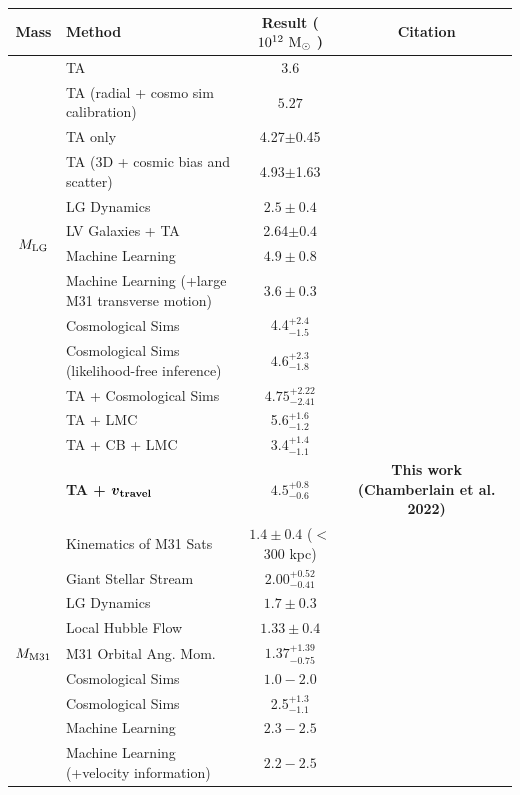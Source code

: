 \documentclass[twocolumn]{aastex631}
\newcommand{\mlg}{\ensuremath{M_{\rm LG}}}
\newcommand{\mmto}{\ensuremath{M_{\rm M31}}}
\newcommand{\bov}{\ensuremath{\boldsymbol{v}}}
\newcommand{\vtrav}{\ensuremath{\bov_{\rm travel}}}
\begin{document}
\begin{table}
  \centering
  \begin{tabular}{clc|c}
    \hline\hline
    Mass & Method & Result ($ 10^{12}~\mathrm{M}_\odot$ ) & Citation \\\hline
    \multirow{12}{*}{\mlg}  & TA & $3.6$ & \cite{Lynden-Bell:1981} \\
    &TA (radial + cosmo sim calibration)  & $5.27$& \cite{LiWhite2008} \\
    &{TA only} & {4.27$\pm$0.45} & \cite{vdm2012} \\
    &{TA (3D + cosmic bias and scatter)} & {4.93$\pm$1.63} &\cite{vdm2012}\\
    & LG Dynamics &$2.5\pm0.4$ & \cite{Diaz2014}\\
    &{LV Galaxies + TA} & {2.64$\pm0.4$} & \cite{Penarrubia2016} \\
    & Machine Learning & $4.9 \pm 0.8$ & \cite{McLeod2017}\\
    & Machine Learning (+large M31 transverse motion) & $3.6\pm0.3$ & 
    \cite{McLeod2017}\\
    & Cosmological Sims & 4.4$^{+2.4}_{-1.5}$ & \cite{Zhai2020}\\
    & Cosmological Sims (likelihood-free inference) & $4.6^{+2.3}_{-1.8}$ &
    \cite{Lemos2021}\\
    & TA + Cosmological Sims & $4.75^{+2.22}_{-2.41}$ & \cite{Hartl2021}\\
    & TA + LMC & 5.6$^{+1.6}_{-1.2}$ & \cite{Benisty2022}\\
    & TA + CB + LMC & 3.4$^{+1.4}_{-1.1}$ & \cite{Benisty2022}\\
    & \textbf{TA + $\boldsymbol{\vtrav}$} & {$\boldsymbol{4.5^{+0.8}_{-0.6}}$}&
    \textbf{This work (Chamberlain et al. 2022)}\\
    \hline
    \multirow{9}{*}{\mmto}& Kinematics of M31 Sats & $1.4 \pm 0.4$ ($<$300 kpc)
    & \cite{Watkins2010}\\
    & Giant Stellar Stream & $2.00^{+0.52}_{-0.41}$ & \cite{Fardal2013}\\
    & LG Dynamics &$1.7\pm0.3$ & \cite{Diaz2014}\\
    & Local Hubble Flow &  $1.33\pm0.4$ & \cite{Penarrubia2016}\\
    & M31 Orbital Ang. Mom. & $1.37^{+1.39}_{-0.75}$ & \cite{Patel2017b}\\
    & Cosmological Sims & $1.0-2.0$ & \cite{Carlesi2017} \\
    & Cosmological Sims & 2.5$^{+1.3}_{-1.1}$ & \cite{Zhai2020}\\
    & Machine Learning & $2.3-2.5$& \cite{Villanueva-Domingo2021}\\
    & Machine Learning (+velocity information) & $2.2-2.5$ &
    \cite{Villanueva-Domingo2021}\\


\end{tabular}
\end{table}
\end{document}
